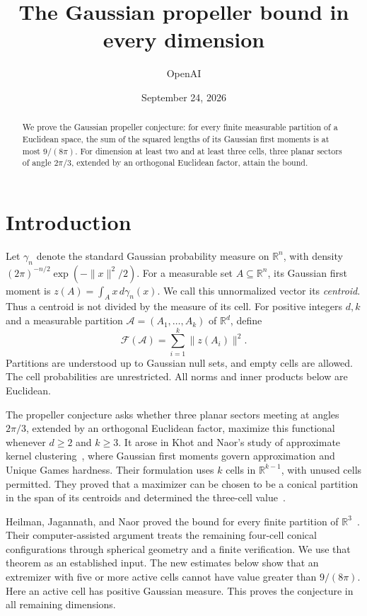 \documentclass[11pt]{article}
\title{The Gaussian propeller bound in every dimension}
\author{OpenAI}
\date{September 24, 2026}
\numberwithin{equation}{section}
\theoremstyle{definition}
\theoremstyle{remark}
\begin{document}
\maketitle
\begin{abstract}
We prove the Gaussian propeller conjecture: for every finite measurable
partition of a Euclidean space, the sum of the squared lengths of its
Gaussian first moments is at most $9/(8\pi)$.
For dimension at least two and at least three cells, three planar
sectors of angle $2\pi/3$, extended by an orthogonal Euclidean factor,
attain the bound.
\end{abstract}

\section{Introduction}
\label{sec:introduction}
Let $\gamma_n$ denote the standard Gaussian probability measure on
$\mathbb R^n$, with density
$(2\pi)^{-n/2}\exp(-\|x\|^2/2)$.
For a measurable set $A\subseteq\mathbb R^n$, its Gaussian first moment is
$z(A)=\int_A x\,d\gamma_n(x)$. We call this unnormalized vector its
\emph{centroid}. Thus a centroid is not divided by the measure of its
cell. For positive integers $d,k$ and a measurable partition
$\mathcal A=(A_1,\ldots,A_k)$ of $\mathbb R^d$, define
\[
 \mathcal F(\mathcal A)=\sum_{i=1}^k\|z(A_i)\|^2.
\]
Partitions are understood up to Gaussian null sets, and empty cells are
allowed. The cell probabilities are unrestricted. All norms and inner
products below are Euclidean.

The propeller conjecture asks whether three planar sectors meeting at
angles $2\pi/3$, extended by an orthogonal Euclidean factor, maximize
this functional whenever $d\ge2$ and $k\ge3$. It arose in Khot and
Naor's study of approximate kernel clustering~\cite{KhotNaor}, where
Gaussian first moments govern approximation and Unique Games hardness.
Their formulation uses $k$ cells in $\mathbb R^{k-1}$, with unused
cells permitted. They proved that a maximizer can be chosen to be a
conical partition in the span of its centroids and determined the
three-cell value~\cite[Theorem~1.2 and Corollary~3.4]{KhotNaor}.

Heilman, Jagannath, and Naor proved the bound for every finite partition
of $\mathbb R^3$~\cite[Theorem~1.1]{HJN}. Their computer-assisted
argument treats the remaining four-cell conical configurations through
spherical geometry and a finite verification. We use that theorem as
an established input. The new estimates below show that an extremizer with five or more
active cells cannot have value greater than $9/(8\pi)$. Here an active
cell has positive Gaussian measure. This proves the conjecture in all
remaining dimensions.
\end{document}
